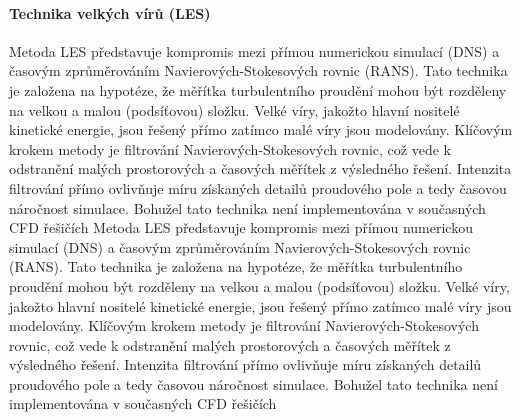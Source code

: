 \paragraph{Technika velkých vírů (LES)}
Metoda LES představuje kompromis mezi přímou numerickou simulací (DNS) a časovým zprůměrováním Navierových-Stokesových rovnic (RANS). Tato technika je založena na hypotéze, že měřítka turbulentního proudění mohou být rozděleny na velkou a malou (podsíťovou) složku. Velké víry, jakožto hlavní nositelé kinetické energie, jsou řešený přímo zatímco malé víry jsou modelovány. Klíčovým krokem metody je filtrování Navierových-Stokesových rovnic, což vede k odstranění malých prostorových a časových měřítek z výsledného řešení. Intenzita filtrování přímo ovlivňuje míru získaných detailů proudového pole a tedy časovou náročnost simulace. Bohužel tato technika není implementována v současných CFD řešičích 
Metoda LES představuje kompromis mezi přímou numerickou simulací (DNS) a časovým zprůměrováním Navierových-Stokesových rovnic (RANS). Tato technika je založena na hypotéze, že měřítka turbulentního proudění mohou být rozděleny na velkou a malou (podsíťovou) složku. Velké víry, jakožto hlavní nositelé kinetické energie, jsou řešený přímo zatímco malé víry jsou modelovány. Klíčovým krokem metody je filtrování Navierových-Stokesových rovnic, což vede k odstranění malých prostorových a časových měřítek z výsledného řešení. Intenzita filtrování přímo ovlivňuje míru získaných detailů proudového pole a tedy časovou náročnost simulace. Bohužel tato technika není implementována v současných CFD řešičích 

